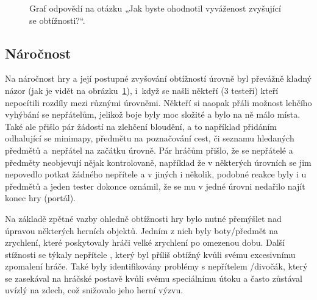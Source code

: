 \begin{figure}[ht]
    \centering
    \caption{Graf odpovědí na otázku „Jak byste ohodnotil vyváženost zvyšující se obtížnosti?“.}
    \label{fig:hodnoceni_vyvazenost}
\end{figure}

\subsection*{Náročnost}
Na náročnost hry a její postupné zvyšování obtížností úrovně byl převážně kladný názor (jak je vidět na obrázku~\ref{fig:hodnoceni_vyvazenost}), i~když se našli někteří (3 testeři) kteří nepocítili rozdíly mezi různými úrovněmi. Někteří si naopak přáli možnost lehčího vyhýbání se nepřátelům, jelikož boje byly moc složité a bylo na ně málo místa. Také ale přišlo pár žádostí na zlehčení bloudění, a to například přidáním odhalující se minimapy, předmětu na poznačování cest, či seznamu hledaných předmětů a~nepřátel na začátku úrovně. Pár hráčům přišlo, že se nepřátelé a předměty neobjevují nějak kontrolovaně, například že v některých úrovních se jim nepovedlo potkat žádného nepřítele a v jiných i několik, podobné reakce byly i u předmětů a jeden tester dokonce oznámil, že se mu v jedné úrovni nedařilo najít konec hry (portál). 

Na základě zpětné vazby ohledně obtížnosti hry bylo nutné přemýšlet nad úpravou některých herních objektů. Jedním z nich byly boty/předmět na zrychlení, které poskytovaly hráči velké zrychlení po omezenou dobu. Další stížnosti se týkaly nepřítele , který byl příliš obtížný kvůli svému excesivnímu zpomalení hráče. Také byly identifikovány problémy s nepřítelem /divočák, který se zasekával na hráčské postavě kvůli svému speciálnímu útoku a často zůstával uvízlý na zdech, což snižovalo jeho herní výzvu.

